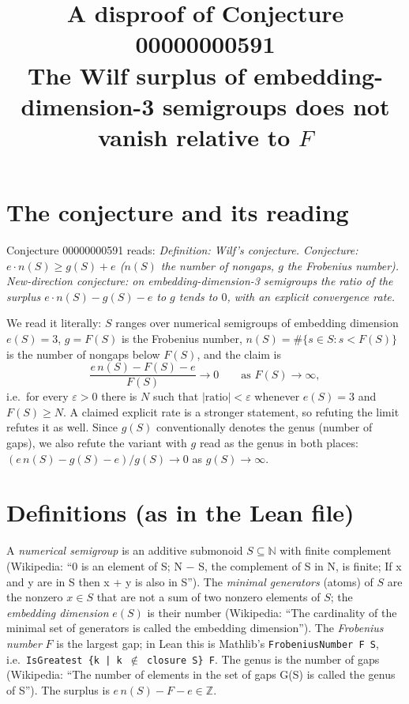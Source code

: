 \documentclass[11pt]{article}
\title{A disproof of Conjecture 00000000591\\[2pt]
\large The Wilf surplus of embedding-dimension-3 semigroups does not vanish relative to $F$}
\date{}
\renewcommand{\_}{\oldus\allowbreak}
\theoremstyle{definition}
\theoremstyle{remark}
\newcommand{\N}{\mathbb{N}}
\begin{document}
\sloppy
\maketitle

\section{The conjecture and its reading}

Conjecture 00000000591 reads: \emph{Definition: Wilf's conjecture. Conjecture: $e\cdot n(S)\ge g(S)+e$
($n(S)$ the number of nongaps, $g$ the Frobenius number). New-direction conjecture: on embedding-dimension-3
semigroups the ratio of the surplus $e\cdot n(S)-g(S)-e$ to $g$ tends to $0$, with an explicit convergence
rate.}

We read it literally: $S$ ranges over numerical semigroups of embedding dimension $e(S)=3$, $g=F(S)$ is the
Frobenius number, $n(S)=\#\{s\in S: s<F(S)\}$ is the number of nongaps below $F(S)$, and the claim is
\[
  \frac{e\,n(S)-F(S)-e}{F(S)}\longrightarrow 0\qquad\text{as }F(S)\to\infty,
\]
i.e.\ for every $\varepsilon>0$ there is $N$ such that $|\text{ratio}|<\varepsilon$ whenever $e(S)=3$ and
$F(S)\ge N$. A claimed explicit rate is a stronger statement, so refuting the limit refutes it as well.
Since $g(S)$ conventionally denotes the genus (number of gaps), we also refute the variant with $g$ read
as the genus in both places: $(e\,n(S)-g(S)-e)/g(S)\to 0$ as $g(S)\to\infty$.

\section{Definitions (as in the Lean file)}

A \emph{numerical semigroup} is an additive submonoid $S\subseteq\N$ with finite complement (Wikipedia:
``0 is an element of S; N $-$ S, the complement of S in N, is finite; If x and y are in S then x + y is
also in S''). The \emph{minimal generators} (atoms) of $S$ are the nonzero $x\in S$ that are not a sum of two
nonzero elements of $S$; the \emph{embedding dimension} $e(S)$ is their number (Wikipedia: ``The cardinality
of the minimal set of generators is called the embedding dimension''). The \emph{Frobenius number} $F$ is
the largest gap; in Lean this is Mathlib's \texttt{FrobeniusNumber F S}, i.e.\
\texttt{IsGreatest \{k | k $\notin$ closure S\} F}. The genus is the number of gaps (Wikipedia: ``The number of
elements in the set of gaps G(S) is called the genus of S''). The surplus is $e\,n(S)-F-e\in\mathbb{Z}$.
\end{document}
